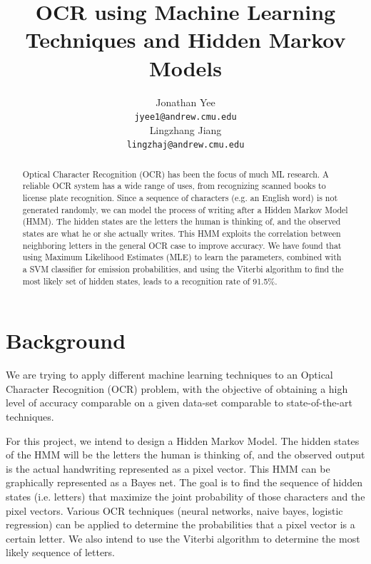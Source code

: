 \documentclass{article} %
\title{OCR using Machine Learning Techniques and Hidden Markov Models}
\author{
Jonathan Yee\\
\texttt{jyee1@andrew.cmu.edu} \\
\And
Lingzhang Jiang \\
\texttt{lingzhaj@andrew.cmu.edu} \\
}
\begin{document}
\newcommand{\mycount}{\mbox{count}}

\maketitle

\begin{abstract}
Optical Character Recognition (OCR) has been the focus of much ML research. A reliable OCR system has a wide range of uses, from recognizing scanned books to license plate recognition. Since a sequence of characters (e.g. an English word) is not generated randomly, we can model the process of writing after a Hidden Markov Model (HMM). The hidden states are the letters the human is thinking of, and the observed states are what he or she actually writes. This HMM exploits the correlation between neighboring letters in the general OCR case to improve accuracy. We have found that using Maximum Likelihood Estimates (MLE) to learn the parameters, combined with a SVM classifier for emission probabilities, and using the Viterbi algorithm to find the most likely set of hidden states, leads to a recognition rate of 91.5\%.
\end{abstract}

\section{Background}
We are trying to apply different machine learning techniques to an Optical Character Recognition (OCR) problem, with the objective of obtaining a high level of accuracy comparable on a given data-set comparable to state-of-the-art techniques.


For this project, we intend to design a Hidden Markov Model. The hidden states of the HMM will be the letters the human is thinking of, and the observed output is the actual handwriting represented as a pixel vector. This HMM can be graphically represented as a Bayes net. The goal is to find the sequence of hidden states (i.e. letters) that maximize the joint probability of those characters and the pixel vectors. Various OCR techniques (neural networks, naive bayes, logistic regression) can be applied to determine the probabilities that a pixel vector is a certain letter. We also intend to use the Viterbi algorithm to determine the most likely sequence of letters.
\end{document}
